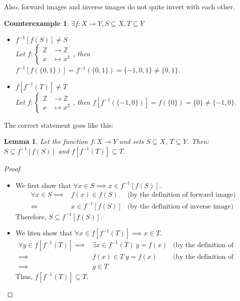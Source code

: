 \documentclass[a4paper]{book}
\newtheorem*{proof}{\textit{Proof.}}
\theoremstyle{break}
\newtheorem{counterexample}{\hspace{-30pt}\protect\dbend\hspace{15pt}Counterexample}[section]
\newtheorem{lemma}{Lemma}[section]
\begin{document}
			Also, forward images and inverse images do not quite invert with each other.
			\begin{counterexample}
				\label{counterexample:not invertable}
				{\boldmath$\exists f:X\to Y, S\subseteq X, T\subseteq Y$}
				\begin{itemize}
					\item {\boldmath $f^{-1}[f(S)]\neq S$}\\
					Let $f:\left\{\begin{aligned}\mathbb{Z}&\to\mathbb{Z}\\x&\mapsto x^2\end{aligned}\right.$, then $f^{-1}[f(\{0,1\})]=f^{-1}(\{0,1\})=\{-1,0,1\}\neq\{0,1\}$.
					\item {\boldmath $f[f^{-1}(T)]\neq T$}\\
					Let $f:\left\{\begin{aligned}\mathbb{Z}&\to\mathbb{Z}\\x&\mapsto x^2\end{aligned}\right.$, then $f[f^{-1}(\{-1,0\})]=f(\{0\})=\{0\}\neq\{-1,0\}$.
				\end{itemize}
			\end{counterexample}
			The correct statement goes like this:
			\begin{lemma}
				\label{Inverse image sub}
				Let the function $f:X\to Y$ and sets $S\subseteq X$, $T\subseteq Y$. Then: $S\subseteq f^{-1}[f(S)]$ and $f[f^{-1}(T)]\subseteq T$.
			\end{lemma}
			\begin{proof}~
				\begin{itemize}
					\item We first show that $\forall x\in S\implies x\in f^{-1}[f(S)]$.
					\begin{align*}
						\forall x\in S \implies&f(x)\in f(S)&\text{(by the definition of forward image)}\\
						\iff&x\in f^{-1}[f(S)]&\text{(by the definition of inverse image)}
					\end{align*}
					Therefore, $S\subseteq f^{-1}[f(S)]$.
					\item We hten show that $\forall x\in f[f^{-1}(T)]\implies x\in T$.
					\begin{align*}
						\forall y\in f[f^{-1}(T)]\implies &\exists x\in f^{-1}(T)~y=f(x) &\text{(by the definition of forward image)}\\
						\implies &f(x)\in T~y=f(x) &\text{(by the definition of inverse image)}\\
						\implies &y\in T
					\end{align*}
					Thus, $f[f^{-1}(T)]\subseteq T$.
				\end{itemize}
			\end{proof}
\end{document}
